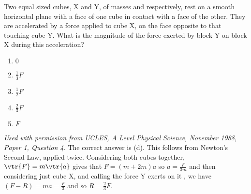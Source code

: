 
\begin{problem}  %
{Two equal sized cubes, X and Y, of masses  and  respectively, rest on a smooth horizontal plane with a face of one cube in contact with a face of the other. They are accelerated by a force  applied to cube X, on the face opposite to that touching cube Y. What is the magnitude of the force exerted by block Y on block X during this acceleration?
\begin{enumerate}
	\item $0$
	\item $\frac{1}{3}F$
	\item $\frac{1}{2}F$
	\item $\frac{2}{3}F$ \answer
	\item $F$
\end{enumerate}
}
{\textit{Used with permission from UCLES, A Level Physical Science, November 1988, Paper 1, Question 4.}}
{The correct answer is (d). This follows from Newton's Second Law, applied twice. Considering both cubes together, $\vtr{F}=m\vtr{a}$ gives that $F=(m + 2m)a$ so $a=\frac{F}{3m}$ and then considering just cube X, and calling the force Y exerts on it , we have $(F - R)= ma =\frac{F}{3}$ and so $R=\frac{2}{3}F$.}
\end{problem}